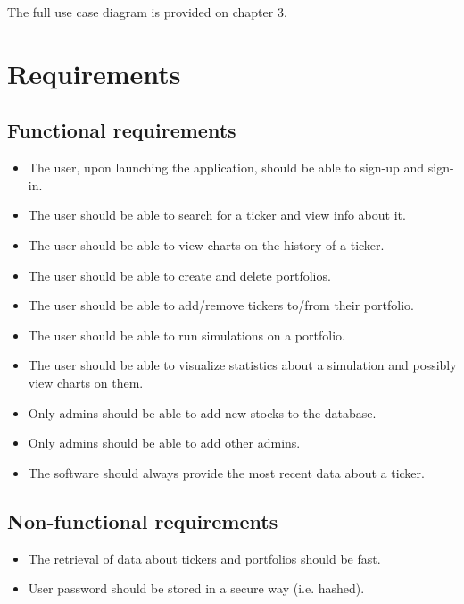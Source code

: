 The full use case diagram is provided on chapter 3.
\section{Requirements}

\subsection{Functional requirements}
\begin{itemize}
	\item The user, upon launching the application, should be able to sign-up and sign-in.
	\item The user should be able to search for a ticker and view info about it.
	\item The user should be able to view charts on the history of a ticker.
	\item The user should be able to create and delete portfolios.
	\item The user should be able to add/remove tickers to/from their portfolio.
	\item The user should be able to run simulations on a portfolio.
	\item The user should be able to visualize statistics about a simulation and possibly view charts on them.
	\item Only admins should be able to add new stocks to the database.
	\item Only admins should be able to add other admins.
	\item The software should always provide the most recent data about a ticker.
\end{itemize}

\subsection{Non-functional requirements}
\begin{itemize}
	\item The retrieval of data about tickers and portfolios should be fast.
	\item User password should be stored in a secure way (i.e. hashed).
\end{itemize}
